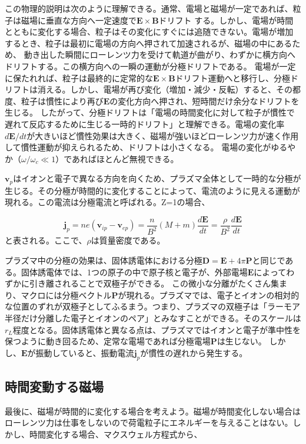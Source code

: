 \documentclass{ltjsarticle}
\numberwithin{equation}{section} %
\begin{document}
この物理的説明は次のように理解できる。通常、電場と磁場が一定であれば、粒子は磁場に垂直な方向へ一定速度で$\bm{E}\times\bm{B}$ドリフト する。しかし、電場が時間とともに変化する場合、粒子はその変化にすぐには追随できない。電場が増加するとき、粒子は最初に電場の方向へ押されて加速されるが、磁場の中にあるため、
動き出した瞬間にローレンツ力を受けて軌道が曲がり、わずかに横方向へドリフトする。この横方向への一瞬の運動が分極ドリフトである。
電場が一定に保たれれば、粒子は最終的に定常的な$\bm{E}\times\bm{B}$ドリフト運動へと移行し、分極ドリフトは消える。しかし、電場が再び変化（増加・減少・反転）すると、その都度、粒子は慣性により再び$\bm{E}$の変化方向へ押され、短時間だけ余分なドリフトを生じる。
したがって、分極ドリフトは「電場の時間変化に対して粒子が慣性で遅れて反応するために生じる一時的ドリフト」と理解できる。電場の変化率$d\bm{E}/dt$が大きいほど慣性効果は大きく、磁場が強いほどローレンツ力が速く作用して慣性運動が抑えられるため、ドリフトは小さくなる。
電場の変化がゆるやか（$\omega/\omega_c \ll 1$）であればほとんど無視できる。

$\bm{v}_p$はイオンと電子で異なる方向を向くため、プラズマ全体として一時的な分極が生じる。その分極が時間的に変化することによって、電流のように見える運動が現れる。この電流は分極電流と呼ばれる。Z=1の場合、

\begin{equation}
  \bm{j}_p = ne(\bm{v}_{ip} - \bm{v}_{ep}) = \frac{n}{B^2}(M+m)\frac{d\bm{E}}{dt} = \frac{\rho}{B^2}\frac{d\bm{E}}{dt}
\end{equation}
と表される。ここで、$\rho$は質量密度である。

プラズマ中の分極の効果は、固体誘電体における分極$\bm{D} = \bm{E} + 4\pi\bm{P}$と同じである。固体誘電体では、1つの原子の中で原子核と電子が、外部電場$\bm{E}$によってわずかに引き離されることで双極子ができる。
この微小な分離がたくさん集まり、マクロには分極ベクトル$\bm{P}$が現れる。プラズマでは、電子とイオンの相対的な位置のずれが双極子としてふるまう。つまり、プラズマの双極子は「ラーモア半径だけ分離した電子とイオンのペア」とみなすことができる。そのスケールは$r_L$程度となる。固体誘電体と異なる点は、プラズマではイオンと電子が準中性を保つように動き回るため、定常な電場であれば分極電場$\bm{P}$は生じない。
しかし、$\bm{E}$が振動していると、振動電流$\bm{j}_p$が慣性の遅れから発生する。


\subsection{時間変動する磁場}
最後に、磁場が時間的に変化する場合を考えよう。磁場が時間変化しない場合はローレンツ力は仕事をしないので荷電粒子にエネルギーを与えることはない。しかし、時間変化する場合、マクスウェル方程式から、
\end{document}
